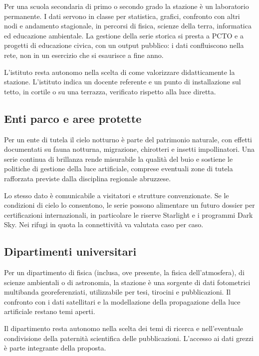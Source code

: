 \documentclass[11pt,a4paper]{report}
\begin{document}
Per una scuola secondaria di primo o secondo grado la stazione è un laboratorio permanente. I dati servono in classe per statistica, grafici, confronto con altri nodi e andamento stagionale, in percorsi di fisica, scienze della terra, informatica ed educazione ambientale. La gestione della serie storica si presta a PCTO e a progetti di educazione civica, con un output pubblico: i dati confluiscono nella rete, non in un esercizio che si esaurisce a fine anno.

L'istituto resta autonomo nella scelta di come valorizzare didatticamente la stazione. L'istituto indica un docente referente e un punto di installazione sul tetto, in cortile o su una terrazza, verificato rispetto alla luce diretta.

\subsection*{Enti parco e aree protette}

Per un ente di tutela il cielo notturno è parte del patrimonio naturale, con effetti documentati su fauna notturna, migrazione, chirotteri e insetti impollinatori. Una serie continua di brillanza rende misurabile la qualità del buio e sostiene le politiche di gestione della luce artificiale, comprese eventuali zone di tutela rafforzata previste dalla disciplina regionale abruzzese.

Lo stesso dato è comunicabile a visitatori e strutture convenzionate. Se le condizioni di cielo lo consentono, le serie possono alimentare un futuro dossier per certificazioni internazionali, in particolare le riserve Starlight e i programmi Dark Sky. Nei rifugi in quota la connettività va valutata caso per caso.

\subsection*{Dipartimenti universitari}

Per un dipartimento di fisica (inclusa, ove presente, la fisica dell'atmosfera), di scienze ambientali o di astronomia, la stazione è una sorgente di dati fotometrici multibanda georeferenziati, utilizzabile per tesi, tirocini e pubblicazioni. Il confronto con i dati satellitari e la modellazione della propagazione della luce artificiale restano temi aperti.

Il dipartimento resta autonomo nella scelta dei temi di ricerca e nell'eventuale condivisione della paternità scientifica delle pubblicazioni. L'accesso ai dati grezzi è parte integrante della proposta.
\end{document}
